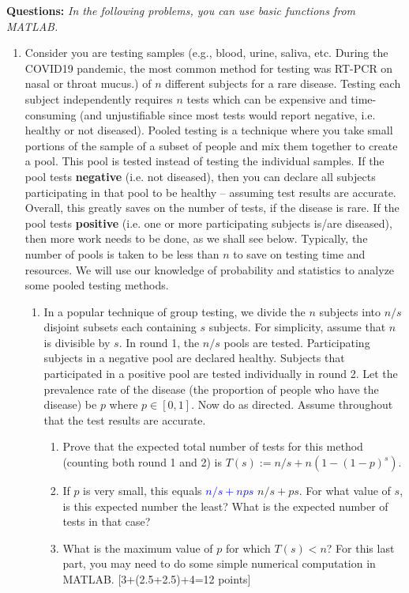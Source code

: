 \documentclass[11pt]{article}
\begin{document}
\textbf{Questions:}
\textit{In the following problems, you can use basic functions from MATLAB.}
\begin{enumerate}
\item Consider you are testing samples (e.g., blood, urine, saliva, etc. During the COVID19 pandemic, the most common method for testing was RT-PCR on nasal or throat mucus.) of $n$ different subjects for a rare disease. Testing each subject independently requires $n$ tests which can be expensive and time-consuming (and unjustifiable since most tests would report negative, i.e. healthy or not diseased). Pooled testing is a technique where you take small portions of the sample of a subset of people and mix them together to create a pool. This pool is tested instead of testing the individual samples. If the pool tests \textbf{negative} (i.e. not diseased), then you can declare all subjects participating in that pool to be healthy -- assuming test results are accurate. Overall, this greatly saves on the number of tests, if the disease is rare. If the pool tests \textbf{positive} (i.e. one or more participating subjects is/are diseased), then more work needs to be done, as we shall see below. Typically, the number of pools is taken to be less than $n$ to save on testing time and resources. We will use our knowledge of probability and statistics to analyze some pooled testing methods. 
\begin{enumerate}
\item In a popular technique of group testing, we divide the $n$ subjects into $n/s$ disjoint subsets each containing $s$ subjects. For simplicity, assume that $n$ is divisible by $s$. In round 1, the $n/s$ pools are tested. Participating subjects in a negative pool are declared healthy. Subjects that participated in a positive pool are tested individually in round 2. Let the prevalence rate of the disease (the proportion of people who have the disease) be $p$ where $p \in [0,1]$. Now do as directed. Assume throughout that the test results are accurate. 
\begin{enumerate}
\item Prove that the expected total number of tests for this method (counting both round 1 and 2) is $T(s) := n/s + n(1-(1-p)^s)$. 
\item If $p$ is very small, this equals \textcolor{blue}{$n/s + nps$} \sout{$n/s + ps$}. For what value of $s$, is this expected number the least? What is the expected number of tests in that case? 
\item What is the maximum value of $p$ for which $T(s) < n$? For this last part, you may need to do some simple numerical computation in MATLAB. \textsf{[3+(2.5+2.5)+4=12 points]}
\end{enumerate}


\end{enumerate}
\end{enumerate}
\end{document}
